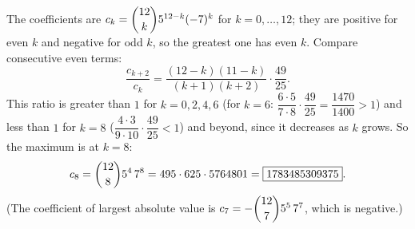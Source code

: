 The coefficients are $c_k=\dbinom{12}{k}5^{12-k}(-7)^k$ for $k=0,\dots,12$; they are positive for even $k$ and negative for odd $k$, so the greatest one has even $k$. Compare consecutive even terms:
\[
\dfrac{c_{k+2}}{c_k}=\dfrac{(12-k)(11-k)}{(k+1)(k+2)}\cdot\dfrac{49}{25}.
\]
This ratio is greater than $1$ for $k=0,2,4,6$ (for $k=6$: $\dfrac{6\cdot5}{7\cdot8}\cdot\dfrac{49}{25}=\dfrac{1470}{1400}>1$) and less than $1$ for $k=8$ ($\dfrac{4\cdot3}{9\cdot10}\cdot\dfrac{49}{25}<1$) and beyond, since it decreases as $k$ grows. So the maximum is at $k=8$:
\[
c_8=\dbinom{12}{8}5^4\,7^8=495\cdot625\cdot5764801=\boxed{1783485309375}.
\]
(The coefficient of largest absolute value is $c_7=-\dbinom{12}{7}5^5\,7^7$, which is negative.)

